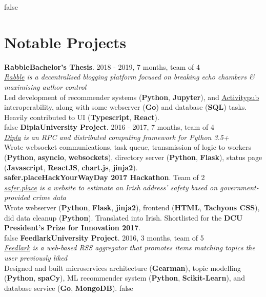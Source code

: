 \documentclass[a4paper, oneside, final]{scrartcl}
\newcommand{\nasc}[2]{\href{#1}{\color{blue}\setulcolor{blue}\ul{#2}}}
\newcommand{\bearna}[0]{\vspace{2.25mm}\\}
\newcommand{\fmtjobtitle}[1]{\textbf{#1}}
\newcommand{\fmtblurb}[1]{\textit{#1}}
\newcommand{\fmtskill}[1]{\textbf{#1}}
\begin{document}
\if false
\section{Notable Projects}
\fmtjobtitle{Rabble\hfill Bachelor's Thesis}. 2018 - 2019, 7 months, team of 4\\
\fmtblurb{\nasc{https://github.com/cpssd/rabble}{Rabble} is a decentralised blogging platform focused on breaking echo chambers \& maximising author control}\\
Led development of recommender systems (\fmtskill{Python}, \fmtskill{Jupyter}), and \nasc{http://activitypub.rocks}{Activitypub} interoperability, along with some webserver (\fmtskill{Go}) and database (\fmtskill{SQL}) tasks. Heavily contributed to UI (\fmtskill{Typescript}, \fmtskill{React}).
\bearna
\fi
\if false
\fmtjobtitle{Dipla\hfill University Project}. 2016 - 2017, 7 months, team of 4\\
\fmtblurb{\nasc{https://cpssd.net/project/dipla/}{Dipla} is an RPC and distributed computing framework for Python 3.5+}\\
Wrote websocket communications, task queue, transmission of logic to workers (\fmtskill{Python}, \fmtskill{asyncio}, \fmtskill{websockets}), directory server (\fmtskill{Python}, \fmtskill{Flask}), status page (\fmtskill{Javascript}, \fmtskill{ReactJS}, \fmtskill{chart.js}, \fmtskill{jinja2}).
\bearna
\fmtjobtitle{safer.place\hfill HackYourWayDay 2017 Hackathon}. Team of 2\\
\fmtblurb{\nasc{http://safer.place}{safer.place} is a website to estimate an Irish address’ safety based on government-provided crime data}\\
Wrote webserver (\fmtskill{Python}, \fmtskill{Flask}, \fmtskill{jinja2}), frontend (\fmtskill{HTML}, \fmtskill{Tachyons CSS}), did data cleanup (\fmtskill{Python}). Translated into Irish. Shortlisted for the \fmtskill{DCU President’s Prize for Innovation 2017}.
\bearna
\fi
\if false
\fmtjobtitle{Feedlark\hfill University Project}. 2016, 3 months, team of 5\\
\fmtblurb{\nasc{https://cpssd.net/project/feedlark/}{Feedlark} is a web-based RSS aggregator that promotes items matching topics the user previously liked}\\
Designed and built microservices architecture (\fmtskill{Gearman}), topic modelling (\fmtskill{Python}, \fmtskill{spaCy}), ML recommender system
(\fmtskill{Python}, \fmtskill{Scikit-Learn}), and database service (\fmtskill{Go}, \fmtskill{MongoDB}).
\fi
\if false
\end{document}
